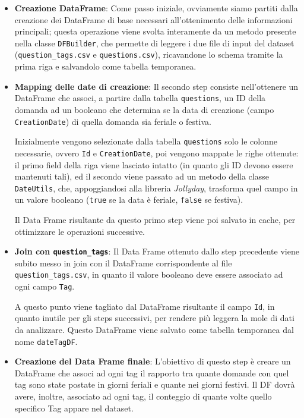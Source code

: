   \begin{itemize}
    \item
      \textbf{Creazione DataFrame}\label{par:job1:spark:implementation:firststep}:
      Come passo iniziale, ovviamente siamo partiti dalla creazione dei DataFrame di base necessari all'ottenimento delle informazioni principali;
      questa operazione viene svolta interamente da un metodo presente nella classe \texttt{DFBuilder},
      che permette di leggere i due file di input del dataset (\texttt{question\_tags.csv} e \texttt{questions.csv}),
      ricavandone lo schema tramite la prima riga e salvandolo come tabella temporanea.
    \item
      \textbf{Mapping delle date di creazione}:
      Il secondo step consiste nell'ottenere un DataFrame che associ, a partire dalla tabella \texttt{questions},
      un ID della domanda ad un booleano che determina se la data di creazione (campo \texttt{CreationDate}) di quella domanda sia feriale o festiva.

      Inizialmente vengono selezionate dalla tabella \texttt{questions} solo le colonne necessarie, ovvero \texttt{Id} e \texttt{CreationDate}, poi vengono mappate le righe ottenute:
      il primo field della riga viene lasciato intatto (in quanto gli ID devono essere mantenuti tali),
      ed il secondo viene passato ad un metodo della classe \texttt{DateUtils}, che, appoggiandosi alla libreria \textit{Jollyday}, trasforma quel campo in un valore booleano
      (\texttt{true} se la data è feriale, \texttt{false} se festiva).

      Il Data Frame risultante da questo primo step viene poi salvato in cache, per ottimizzare le operazioni successive.
    \item
      \textbf{Join con \texttt{question\_tags}}:
      Il Data Frame ottenuto dallo step precedente viene subito messo in join con il DataFrame corrispondente al file \texttt{question\_tags.csv},
      in quanto il valore booleano deve essere associato ad ogni campo \texttt{Tag}.

      A questo punto viene tagliato dal DataFrame risultante il campo \texttt{Id}, in quanto inutile per gli steps successivi, per rendere più leggera la mole di dati da analizzare.
      Questo DataFrame viene salvato come tabella temporanea dal nome \texttt{dateTagDF}.

    \item
      \textbf{Creazione del Data Frame finale}:
      L'obiettivo di questo step è creare un DataFrame che associ ad ogni tag il rapporto tra quante domande con quel tag sono state postate in giorni feriali e quante nei giorni festivi.
      Il DF dovrà avere, inoltre, associato ad ogni tag, il conteggio di quante volte quello specifico Tag appare nel dataset.


\end{itemize}
